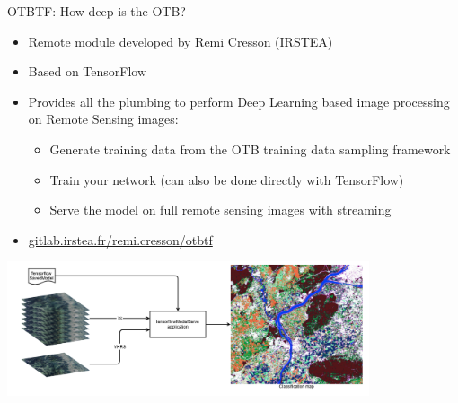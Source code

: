 \begin{frame}{OTBTF: How deep is the OTB?}
  \begin{itemize}
  \item Remote  module developed by Remi Cresson (IRSTEA)
  \item Based on TensorFlow
  \item Provides all the plumbing to perform Deep Learning based image processing on Remote Sensing images:
    \begin{itemize}
      \item Generate training data from the OTB training data sampling framework
      \item Train your network (can also be done directly with TensorFlow)
      \item Serve the model on full remote sensing images with streaming
    \end{itemize}
    \item \url{gitlab.irstea.fr/remi.cresson/otbtf}
  \end{itemize}
\begin{center}
  \includegraphics[width=0.8\textwidth]{images/classif_map.png}
\end{center}
\end{frame}
  
